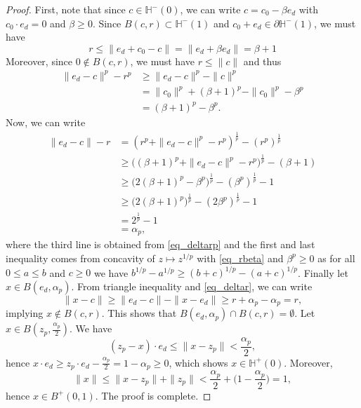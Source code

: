 \documentclass[a4paper, 11pt]{article}
\theoremstyle{plain}
\theoremstyle{definition}
\numberwithin{equation}{section}
\begin{document}
\begin{proof}
    First, note that since $c\in\mathbb H^-(0)$, we can write $c=c_0-\beta e_d$ with $c_0\cdot e_d=0$ and $\beta\geq 0$. Since $B(c, r)\subset\mathbb H^-(1)$ and $c_0+e_d\in\mathbb \partial \mathbb H^-(1)$, we must have
        \begin{equation}
            \label{eq_rbeta}
            r\leq \|e_d+c_0-c\|=\|e_d+\beta e_d\|=\beta+1
        \end{equation}
    Moreover, since $0\notin B(c,r)$, we must have $r\leq\|c\|$ and thus
        \begin{equation}
            \label{eq_deltarp}
            \begin{split}
                \|e_d-c\|^p-r^p&\geq\|e_d-c\|^p-\|c\|^p\\
                &=\|c_0\|^p+(\beta+1)^p-\|c_0\|^p-\beta^p\\
                &=(\beta+1)^p-\beta^p.
            \end{split}
        \end{equation}
    Now, we can write
        \begin{equation}
            \label{eq_deltar}
            \begin{split}
                \|e_d-c\|-r&=(r^p+\|e_d-c\|^p-r^p)^{\frac{1}{p}}-(r^p)^{\frac{1}{p}}\\
                &\geq \big((\beta+1)^p+\|e_d-c\|^p-r^p\big)^{\frac{1}{p}}-(\beta+1)\\
                &\geq\big(2(\beta+1)^p-\beta^p\big)^{\frac{1}{p}}-(\beta^p)^{\frac{1}{p}}-1\\
                &\geq\big(2(\beta+1)^p\big)^{\frac{1}{p}}-(2\beta^p)^{\frac{1}{p}}-1\\
                &=2^{\frac{1}{p}}-1\\
                &=\alpha_p,
            \end{split}
        \end{equation}
    where the third line is obtained from \eqref{eq_deltarp} and the first and last inequality comes from concavity of $z\mapsto z^{1/p}$ with \eqref{eq_rbeta} and $\beta^p\geq 0$ as for all $0\leq a\leq b$ and $c\geq 0$ we have $b^{1/p}-a^{1/p}\geq (b+c)^{1/p}-(a+c)^{1/p}$. Finally let $x\in B(e_d,\alpha_p)$. From triangle inequality and \eqref{eq_deltar}, we can write
        \begin{equation*}
            \|x-c\|\geq\|e_d-c\|-\|x-e_d\|\geq r+\alpha_p-\alpha_p=r,
        \end{equation*}
    implying $x\notin B(c,r)$. This shows that $B(e_d,\alpha_p)\cap B(c, r)=\emptyset$. Let $x\in B(z_p,\frac{\alpha_p}{2})$. We have
        \[(z_p-x)\cdot e_d\leq\|x-z_p\|<\frac{\alpha_p}{2},\]
    hence $x\cdot e_d\geq z_p\cdot e_d-\frac{\alpha_p}{2}=1-\alpha_p\geq 0$, which shows $x\in\mathbb H^+(0)$. Moreover,
        \[\|x\|\leq\|x-z_p\|+\|z_p\|<\frac{\alpha_p}{2}+\Big(1-\frac{\alpha_p}{2}\Big)=1,\]
    hence $x\in B^+(0, 1)$. The proof is complete.
\end{proof}
\end{document}
